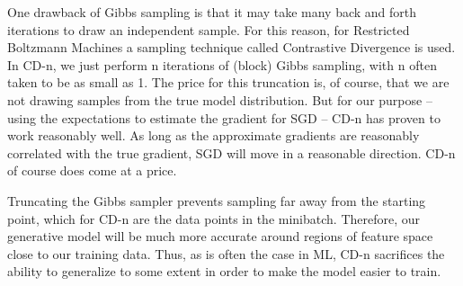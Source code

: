 One drawback of Gibbs sampling is that it may take many back and forth iterations to draw an independent sample. For this reason, for Restricted Boltzmann Machines a sampling technique called Contrastive Divergence is used. In CD-n, we just perform n iterations of (block) Gibbs sampling, with n often taken to be as small as 1. The price for this truncation is, of course, that we are not drawing samples from the true model distribution. But for our purpose – using the expectations to estimate the gradient for SGD – CD-n has proven to work reasonably well. As long as the approximate gradients are reasonably correlated with the true gradient, SGD will move in a reasonable direction. CD-n of course does come at a price.

Truncating the Gibbs sampler prevents sampling far away from the starting point, which for CD-n are the data points in the minibatch. Therefore, our generative model will be much more accurate around regions of feature space close to our training data. Thus, as is often the case in ML, CD-n sacrifices the ability to generalize to some extent in order to make the model easier to train.
